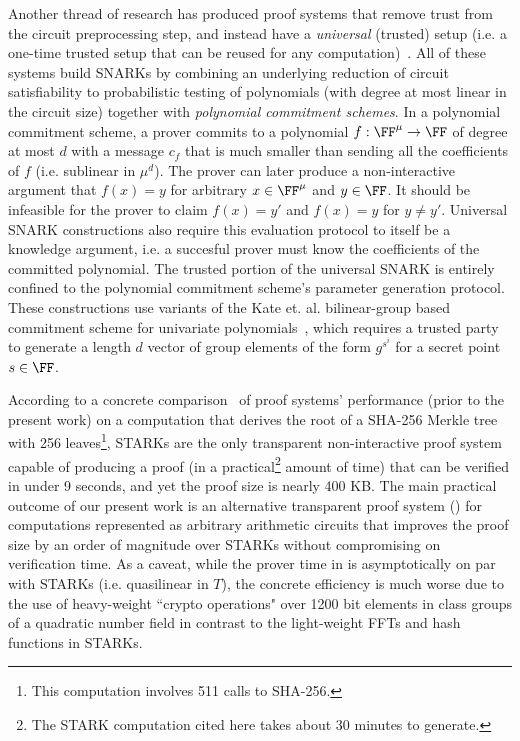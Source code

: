 Another thread of research has produced proof systems that remove trust from the circuit preprocessing step, and instead have a \emph{universal} (trusted) setup (i.e. a one-time trusted setup that can be reused for any computation)~\cite{Sonic, Plonk, Libra, Spartan}. All of these systems build SNARKs by combining an underlying reduction of circuit satisfiability to probabilistic testing of polynomials (with degree at most linear in the circuit size) together with \emph{polynomial commitment schemes}. In a polynomial commitment scheme, a prover commits to a polynomial $f: \FF^\mu \rightarrow \FF$ of degree at most $d$ with a message $c_f$ that is much smaller than sending all the coefficients of $f$ (i.e. sublinear in $\mu^d$). The prover can later produce a non-interactive argument that $f(x) = y$ for arbitrary $x \in \FF^\mu$ and $y \in \FF$. It should be infeasible for the prover to claim $f(x) = y'$ and $f(x) = y$ for $y \neq y'$. Universal SNARK constructions also require this evaluation protocol to itself be a knowledge argument, i.e. a succesful prover must know the coefficients of the committed polynomial. The trusted portion of the universal SNARK is entirely confined to the polynomial commitment scheme's parameter generation protocol. These constructions use variants of the Kate et. al. bilinear-group based commitment scheme for univariate polynomials~\cite{AC:KatZavGol10}, which requires a trusted party to generate a length $d$ vector of group elements of the form $g^{s^i}$ for a secret point $s \in \FF$. 

According to a concrete comparison~\cite{Libra} of proof systems' performance (prior to the present work) on a computation that derives the root of a SHA-256 Merkle tree with 256 leaves\footnote{This computation involves 511 calls to SHA-256.}, STARKs are the only transparent non-interactive proof system capable of producing a proof (in a practical\footnote{The STARK computation cited here takes about 30 minutes to generate.}  amount of time) that can be verified in under 9 seconds, and yet the proof size is nearly 400 KB. The main practical outcome of our present work is an alternative transparent proof system () for computations represented as arbitrary arithmetic circuits that improves the proof size by an order of magnitude over STARKs without compromising on verification time. As a caveat, while the prover time in  is asymptotically on par with STARKs (i.e. quasilinear in $T$), the concrete efficiency is much worse due to the use of heavy-weight ``crypto operations" over 1200 bit elements in class groups of a quadratic number field in contrast to the light-weight FFTs and hash functions in STARKs. 

